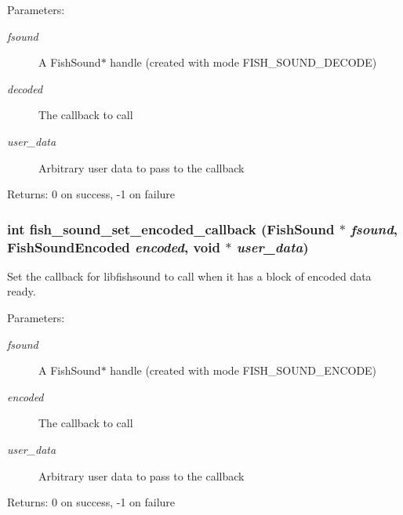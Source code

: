 \begin{Desc}
\item[Parameters:]
\begin{description}
\item[{\em fsound}]A Fish\-Sound$\ast$ handle (created with mode FISH\_\-SOUND\_\-DECODE) \item[{\em decoded}]The callback to call \item[{\em user\_\-data}]Arbitrary user data to pass to the callback \end{description}
\end{Desc}
\begin{Desc}
\item[Returns:]0 on success, -1 on failure \end{Desc}
\subsubsection{\setlength{\rightskip}{0pt plus 5cm}int fish\_\-sound\_\-set\_\-encoded\_\-callback ({\bf Fish\-Sound} $\ast$ {\em fsound}, {\bf Fish\-Sound\-Encoded} {\em encoded}, void $\ast$ {\em user\_\-data})}\label{fishsound_8h_a6}


Set the callback for libfishsound to call when it has a block of encoded data ready. 

\begin{Desc}
\item[Parameters:]
\begin{description}
\item[{\em fsound}]A Fish\-Sound$\ast$ handle (created with mode FISH\_\-SOUND\_\-ENCODE) \item[{\em encoded}]The callback to call \item[{\em user\_\-data}]Arbitrary user data to pass to the callback \end{description}
\end{Desc}
\begin{Desc}
\item[Returns:]0 on success, -1 on failure \end{Desc}
